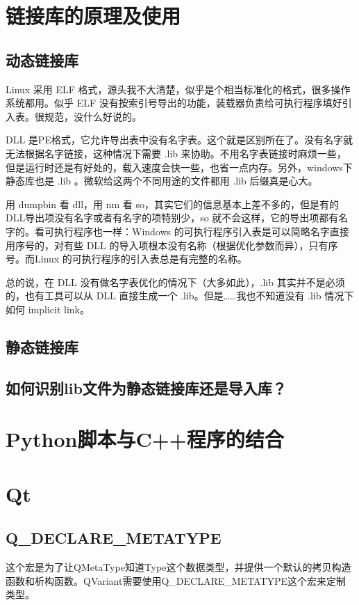 \section{链接库的原理及使用}
\subsection{动态链接库}
Linux 采用 ELF 格式，源头我不大清楚，似乎是个相当标准化的格式，很多操作系统都用。似乎 ELF 没有按索引号导出的功能，装载器负责给可执行程序填好引入表。很规范，没什么好说的。

DLL 是PE格式，它允许导出表中没有名字表。这个就是区别所在了。没有名字就无法根据名字链接，这种情况下需要 .lib 来协助。不用名字表链接时麻烦一些，但是运行时还是有好处的，载入速度会快一些，也省一点内存。另外，windows下静态库也是 .lib 。微软给这两个不同用途的文件都用 .lib 后缀真是心大。

用 dumpbin 看 dll，用 nm 看 so，其实它们的信息基本上差不多的，但是有的DLL导出项没有名字或者有名字的项特别少，so 就不会这样，它的导出项都有名字的。看可执行程序也一样：Windows 的可执行程序引入表是可以简略名字直接用序号的，对有些 DLL 的导入项根本没有名称（根据优化参数而异），只有序号。而Linux 的可执行程序的引入表总是有完整的名称。

总的说，在 DLL 没有做名字表优化的情况下（大多如此），.lib 其实并不是必须的，也有工具可以从 DLL 直接生成一个 .lib。但是……我也不知道没有 .lib 情况下如何 implicit link。
\subsection{静态链接库}
\subsection{如何识别lib文件为静态链接库还是导入库？}
\section{Python脚本与C++程序的结合}

\section{Qt}
\subsection{Q\_DECLARE\_METATYPE}
这个宏是为了让QMetaType知道Type这个数据类型，并提供一个默认的拷贝构造函数和析构函数。QVariant需要使用Q\_DECLARE\_METATYPE这个宏来定制类型。

